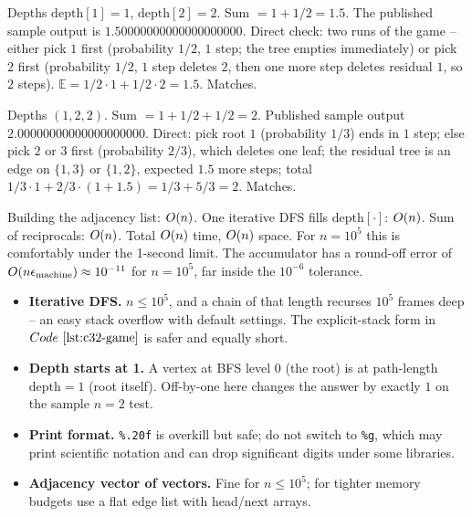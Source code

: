 \begin{tracebox}[Sample 1: \, \(n=2\), edge \(1\!-\!2\)]
Depths \(\mathrm{depth}[1]=1\), \(\mathrm{depth}[2]=2\).  Sum \(=1+1/2=
1.5\).  The published sample output is \(1.50000000000000000000\).
Direct check: two runs of the game -- either pick \(1\) first (probability
\(1/2\), \(1\) step; the tree empties immediately) or pick \(2\) first
(probability \(1/2\), \(1\) step deletes \(2\), then one more step deletes
residual \(1\), so \(2\) steps).  \(\mathbb{E}=1/2\cdot 1 + 1/2\cdot 2 =
1.5\).  Matches.
\end{tracebox}
\begin{tracebox}[Sample 2: \, \(n=3\), edges \(1\!-\!2\) and \(1\!-\!3\)]
Depths \((1,2,2)\).  Sum \(=1+1/2+1/2=2\).  Published sample output
\(2.00000000000000000000\).  Direct: pick root \(1\) (probability \(1/3\))
ends in \(1\) step; else pick \(2\) or \(3\) first (probability \(2/3\)),
which deletes one leaf; the residual tree is an edge on \(\{1,3\}\) or
\(\{1,2\}\), expected \(1.5\) more steps; total \(1/3\cdot 1 + 2/3\cdot
(1 + 1.5) = 1/3 + 5/3 = 2\).  Matches.
\end{tracebox}

\begin{complexitybox}
Building the adjacency list: \(O(n)\).  One iterative DFS fills
\(\mathrm{depth}[\cdot]\): \(O(n)\).  Sum of reciprocals: \(O(n)\).
Total \(O(n)\) time, \(O(n)\) space.  For \(n=10^5\) this is
comfortably under the 1-second limit.  The  accumulator has a
round-off error of \(O(n\epsilon_{\mathrm{machine}})\approx 10^{-11}\)
for \(n=10^5\), far inside the \(10^{-6}\) tolerance.
\end{complexitybox}

\begin{hardeningbox}
\begin{itemize}[nosep,leftmargin=1.4em]
\item \textbf{Iterative DFS.}  \(n\le 10^5\), and a chain of that length
      recurses \(10^5\) frames deep -- an easy stack overflow with default
      settings.  The explicit-stack form in \(\coderef{c32-game}\) is
      safer and equally short.
\item \textbf{Depth starts at 1.}  A vertex at BFS level 0 (the root) is at
      path-length \(\mathrm{depth}=1\) (root itself).  Off-by-one here
      changes the answer by exactly \(1\) on the sample \(n=2\) test.
\item \textbf{Print format.}  \texttt{\%.20f} is overkill but safe; do not
      switch to \texttt{\%g}, which may print scientific notation and can
      drop significant digits under some libraries.
\item \textbf{Adjacency vector of vectors.}  Fine for \(n\le 10^5\); for
      tighter memory budgets use a flat edge list with head/next arrays.
\end{itemize}
\end{hardeningbox}

